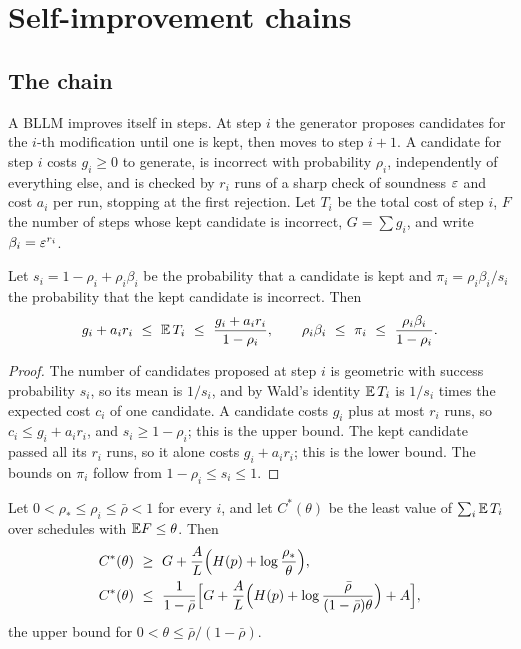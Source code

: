 \section{Self-improvement chains}\label{sec:chains}

\subsection{The chain}

A BLLM improves itself in steps. At step $i$ the generator proposes candidates for the $i$-th modification until one is kept, then moves to step $i+1$. A candidate for step $i$ costs $g_{i}\ge0$ to generate, is incorrect with probability $\rho_{i}$, independently of everything else, and is checked by $r_{i}$ runs of a sharp check of soundness $\varepsilon$ and cost $a_{i}$ per run, stopping at the first rejection. Let $T_{i}$ be the total cost of step $i$, $F$ the number of steps whose kept candidate is incorrect, $G=\sum g_{i}$, and write $\beta_{i}=\varepsilon^{r_{i}}$.

\begin{lemma}\label{lem:onestep}
Let $s_{i}=1-\rho_{i}+\rho_{i}\beta_{i}$ be the probability that a candidate is kept and $\pi_{i}=\rho_{i}\beta_{i}/s_{i}$ the probability that the kept candidate is incorrect. Then
\[
g_{i}+a_{i}r_{i}\ \le\ \EE\,T_{i}\ \le\ \frac{g_{i}+a_{i}r_{i}}{1-\rho_{i}},\qquad \rho_{i}\beta_{i}\ \le\ \pi_{i}\ \le\ \frac{\rho_{i}\beta_{i}}{1-\rho_{i}} .
\]
\end{lemma}

\begin{proof}
The number of candidates proposed at step $i$ is geometric with success probability $s_{i}$, so its mean is $1/s_{i}$, and by Wald's identity $\mathbb{E}\,T_{i}$ is $1/s_{i}$ times the expected cost $c_{i}$ of one candidate. A candidate costs $g_{i}$ plus at most $r_{i}$ runs, so $c_{i}\le g_{i}+a_{i}r_{i}$, and $s_{i}\ge1-\rho_{i}$; this is the upper bound. The kept candidate passed all its $r_{i}$ runs, so it alone costs $g_{i}+a_{i}r_{i}$; this is the lower bound. The bounds on $\pi_{i}$ follow from $1-\rho_{i}\le s_{i}\le1$.
\end{proof}

\begin{mainthm}\label{thm:B}
Let $0<\rho_{\ast}\le\rho_{i}\le\bar\rho<1$ for every $i$, and let $C^{*}(\theta)$ be the least value of $\sum_{i}\mathbb{E}\,T_{i}$ over schedules with $\mathbb{E} F\le\theta$. Then
\[
\begin{aligned}
C^{*}(\theta)&\ \ge\ G+\frac AL\Bigl(H(p)+\log\frac{\rho_{\ast}}{\theta}\Bigr),\\
C^{*}(\theta)&\ \le\ \frac1{1-\bar\rho}\Bigl[G+\frac AL\Bigl(H(p)+\log\frac{\bar\rho}{(1-\bar\rho)\theta}\Bigr)+A\Bigr],
\end{aligned}
\]
the upper bound for $0<\theta\le\bar\rho/(1-\bar\rho)$.
\end{mainthm}

